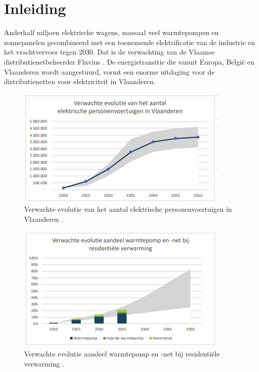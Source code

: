 \documentclass{hogent-article}
\begin{document}
\tableofcontents

\bigskip

\section{Inleiding}%
\label{sec:inleiding}
Anderhalf miljoen elektrische wagens, massaal veel warmtepompen en zonnepanelen gecombineerd met een toenemende elektrificatie van de industrie en het vrachtvervoer tegen 2030. Dat is de verwachting van de Vlaamse distributienetbeheerder Fluvius \autocite{Verdoodt2022}. De energietransitie die vanuit Europa, België en Vlaanderen wordt aangestuurd, vormt een enorme uitdaging voor de distributienetten voor elektriciteit in Vlaanderen.

\begin{figure}
    \centering\includegraphics[scale=0.5]{img/Aantal_el_personenvoertuigen}
    \caption{\label{fig:Aantal_el_personenvoertuigen}Verwachte evolutie van het aantal
        elektrische personenvoertuigen in Vlaanderen \autocite{Verdoodt2022}.}
\end{figure}

\begin{figure}
    \centering\includegraphics[scale=0.5]{img/Evolutie_Warmtepompen}
    \caption{\label{fig:Evolutie_Warmtepompen}Verwachte evolutie aandeel warmtepomp en -net bij
        residentiële verwarming \autocite{Verdoodt2022}.}
\end{figure}
\end{document}
